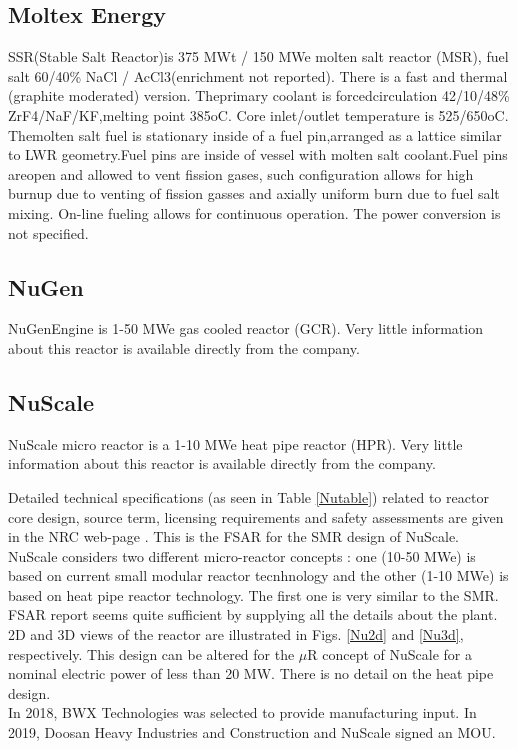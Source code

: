 \subsection{Moltex Energy}
SSR(Stable Salt Reactor)is 375 MWt / 150 MWe molten salt reactor (MSR), fuel salt 60/40\% NaCl / AcCl3(enrichment  not  reported). There  is  a  fast  and  thermal  (graphite  moderated)  version. Theprimary  coolant  is forcedcirculation 42/10/48\% ZrF4/NaF/KF,melting point 385oC. Core inlet/outlet temperature is 525/650oC. Themolten salt fuel is stationary inside of a fuel pin,arranged as a lattice similar to LWR geometry.Fuel pins are inside of vessel with molten salt coolant.Fuel pins areopen and allowed to vent fission gases, such configuration allows for high burnup  due  to  venting  of  fission  gasses  and  axially  uniform  burn  due  to fuel salt  mixing. On-line  fueling  allows  for continuous operation. The power conversion is not specified.

\subsection{NuGen}
NuGenEngine  is  1-50  MWe  gas  cooled  reactor  (GCR). Very  little  information  about  this  reactor  is available directly from the company.

\subsection{NuScale}
NuScale micro reactor is a 1-10 MWe heat pipe reactor (HPR). Very little information about this reactor is available directly from the company.

Detailed technical specifications (as seen in Table \ref{Nutable}) related to reactor core design, source term, licensing requirements and safety assessments are given in the NRC web-page \cite{nuscale_chapter_2018-1}. This is the \gls{FSAR} for the SMR design of NuScale. NuScale considers two different micro-reactor concepts \cite{nichol_cost_2019}: one (10-50 MWe) is based on current small modular reactor tecnhnology and the other (1-10 MWe) is based on heat pipe reactor technology. The first one is very similar to the SMR. FSAR report  seems quite sufficient by supplying all the details about the plant. 2D and 3D views of the reactor are illustrated in Figs. \ref{Nu2d} and \ref{Nu3d}, respectively. This design can be altered for the $\mu$R concept of NuScale for a nominal electric power of less than 20 MW. There is no detail on the heat pipe design.  \\
In 2018, BWX Technologies was selected to provide manufacturing input. In 2019, Doosan Heavy Industries and Construction and NuScale signed an MOU. 

